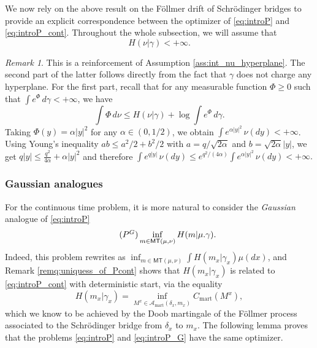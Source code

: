 \documentclass[reqno, a4paper]{amsart}
\theoremstyle{plain}
\theoremstyle{definition}
\theoremstyle{remark}
\newtheorem{remark}[theorem]{Remark}
\numberwithin{equation}{section}
\numberwithin{theorem}{section}
\newcommand{\MT}{\mathsf{MT}}
\begin{document}
	We now rely on the above result on the Föllmer drift of Schrödinger bridges to provide an explicit correspondence between the optimizer of \eqref{eq:introP} and \eqref{eq:introP_cont}. Throughout the whole subsection, we will assume that
	\begin{equation}\label{eq:reinforced_assumption_gaussian}
		H(\nu|\gamma)< + \infty. \tag{H}
	\end{equation}
	\begin{remark}\label{rem:implications_assumptions}
		This is a reinforcement of Assumption \eqref{ass:int_nu_hyperplane}. The second part of the latter follows directly from the fact that $\gamma$ does not charge any hyperplane. For the first part, recall that for any measurable function $\Phi \ge 0$ such that 
		$\int e^{\Phi} \, d\gamma < +\infty$, we have
		\[
		\int \Phi \, d\nu \le H(\nu|\gamma) + \log \int e^{\Phi} \, d\gamma.
		\]
		Taking $\Phi(y) = \alpha |y|^2$ for any $\alpha \in (0,1/2)$, we obtain
		$
		\int e^{\alpha |y|^2} \, \nu(dy) < +\infty
		$.  
		Using Young's inequality $ab \le a^2/2 + b^2/2$ with 
		$a = q/\sqrt{2\alpha}$ and $b = \sqrt{2\alpha}|y|$, we get
		$
		q|y| \le \frac{q^2}{4\alpha} + \alpha |y|^2
		$ 
		and therefore $\int e^{q|y|} \, \nu(dy)
		\le e^{q^2/(4\alpha)} \int e^{\alpha |y|^2} \, \nu(dy)
		< +\infty.$
	\end{remark}
	\subsubsection{Gaussian analogues}
	
	For the continuous time problem, it is more natural to consider the \emph{Gaussian} analogue of \eqref{eq:introP}
	\begin{align}\label{eq:introP_G}\tag{$P^{G}$}
		\inf_{m\in\MT(\mu,\nu)} H(m|\mu.\gamma).
	\end{align}
	Indeed, this problem rewrites as $\inf_{m\in\MT(\mu,\nu)} \int H(m_x|\gamma_x)\mu(dx)$, 
	and Remark \ref{remq:uniquess_of_Pcont} shows that $H(m_x|\gamma_x)$ is related to \eqref{eq:introP_cont} with deterministic start, via the equality
	\begin{equation*}
		H(m_x|\gamma_x) = \inf_{M^x \in \mathcal A_{\mathrm{mart}}(\delta_x,m_x)} C_{\mathrm{mart}}(M^x),
	\end{equation*}
	which we know to be achieved by the Doob martingale of the Föllmer process associated to the Schrödinger bridge from $\delta_x$ to $m_x$. The following lemma proves that the problems \eqref{eq:introP} and \eqref{eq:introP_G} have the same optimizer.
	
\end{document}
